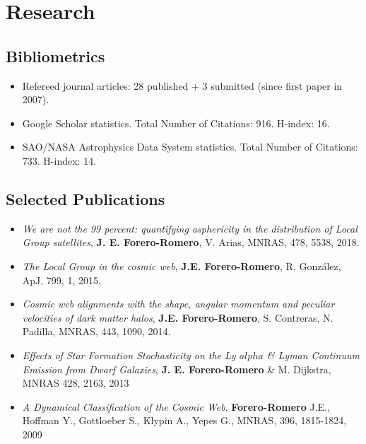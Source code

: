 \documentclass[a4paper,10pt]{article} %
\begin{document}
\color{red}
\section{Research}
\color{black}

\subsection{Bibliometrics}
\begin{itemize}
\item Refereed journal articles:  28 published + 3 submitted (since
  first paper in 2007).
\item Google Scholar statistics. Total Number of Citations: 916. H-index: 16.
\item SAO/NASA Astrophysics Data System statistics. Total Number of
  Citations: 733. H-index: 14. 
\end{itemize}


\subsection{Selected Publications}
\begin{itemize}

\item {\it We are not the 99 percent: quantifying
  asphericity in the distribution of Local Group satellites}, {\bf
    J. E. Forero-Romero}, V. Arias,  MNRAS, 478, 5538, 2018.

\item{\it The Local Group in the cosmic web}, {\bf
  J.E. Forero-Romero}, R. Gonz\'alez, ApJ, 799, 1, 2015.

\item{\it Cosmic web alignments with the shape, angular momentum
  and peculiar velocities of dark matter halos}, 
  {\bf J.E. Forero-Romero}, S. Contreras, N. Padilla, MNRAS, 443,
  1090, 2014. 

\item {\it Effects of Star Formation Stochasticity on the Ly
  $alpha$ \& Lyman Continuum Emission from Dwarf Galaxies}, {\bf
  J. E. Forero-Romero} \& M. Dijkstra, MNRAS 428, 2163, 2013 

\item  {\it A Dynamical Classification of the  Cosmic Web}.  {\bf
  Forero-Romero} J.E., Hoffman Y.,  Gottloeber S., Klypin A., Yepes
  G., MNRAS, 396, 1815-1824, 2009   

\end{itemize}
\end{document}
